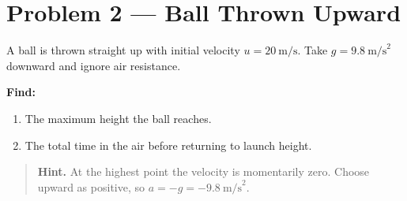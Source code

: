 
\section*{Problem 2 --- Ball Thrown Upward}

A ball is thrown straight up with initial velocity
$u = 20\ \text{m/s}$. Take $g = 9.8\ \text{m/s}^{2}$ downward and ignore
air resistance.

\textbf{Find:}
\begin{enumerate}
  \item The maximum height the ball reaches.
  \item The total time in the air before returning to launch height.
\end{enumerate}

\begin{quote}
\textbf{Hint.} At the highest point the velocity is momentarily zero.
Choose upward as positive, so $a = -g = -9.8\ \text{m/s}^{2}$.
\end{quote}
